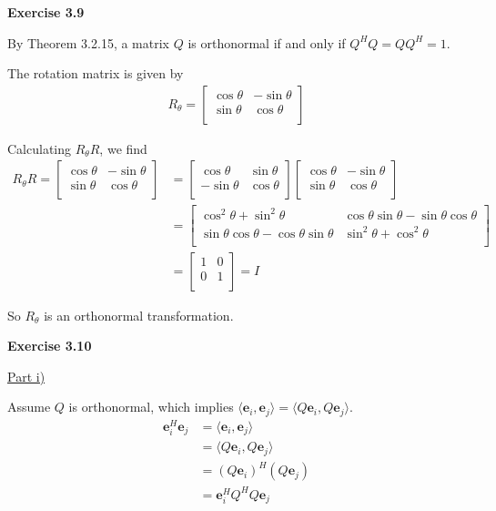 \documentclass[letterpaper,12pt]{article}
\newcommand{\vect}[1]{\mathbf{#1}}
\begin{document}
\textbf{Exercise 3.9}

By Theorem 3.2.15, a matrix $Q$ is orthonormal if and only if $Q^HQ = QQ^H = 1$.

The rotation matrix is given by
\begin{align*}
  R_\theta = 
  \begin{bmatrix}
    \cos \theta & -\sin \theta \\
    \sin \theta & \cos \theta \\
  \end{bmatrix}
\end{align*}

Calculating $R_{\theta}R$, we find
\begin{align*}
  R_{\theta}R = 
  \begin{bmatrix}
    \cos \theta & -\sin \theta \\
    \sin \theta & \cos \theta \\
  \end{bmatrix}
  &=
  \begin{bmatrix}
    \cos \theta & \sin \theta \\
    -\sin \theta & \cos \theta \\
  \end{bmatrix}
  \begin{bmatrix}
    \cos \theta & -\sin \theta \\
    \sin \theta & \cos \theta \\
  \end{bmatrix}
  \\ &=
  \begin{bmatrix}
    \cos^2 \theta + \sin^2 \theta & \cos \theta \sin \theta - \sin \theta \cos \theta \\
    \sin \theta \cos \theta - \cos \theta \sin \theta & \sin^2 \theta + \cos^2 \theta \\
  \end{bmatrix}
  \\ &=
  \begin{bmatrix}
    1 & 0 \\
    0 & 1 \\
  \end{bmatrix}
  = I
\end{align*}
 
So $R_\theta$ is an orthonormal transformation.

\textbf{Exercise 3.10}

\underline{Part i)}

Assume $Q$ is orthonormal, which implies $\langle \vect{e}_i, \vect{e}_j \rangle = \langle Q \vect{e}_i,  Q \vect{e}_j \rangle$.
\begin{align*}
  \vect{e}_i^H \vect{e}_j &= 
  \langle \vect{e}_i, \vect{e}_j \rangle \\
  &= \langle Q \vect{e}_i,  Q \vect{e}_j \rangle \\
  &= (Q \vect{e}_i)^H  (Q \vect{e}_j) \\
  &= \vect{e}_i^H Q^H  Q \vect{e}_j
\end{align*}
\end{document}
